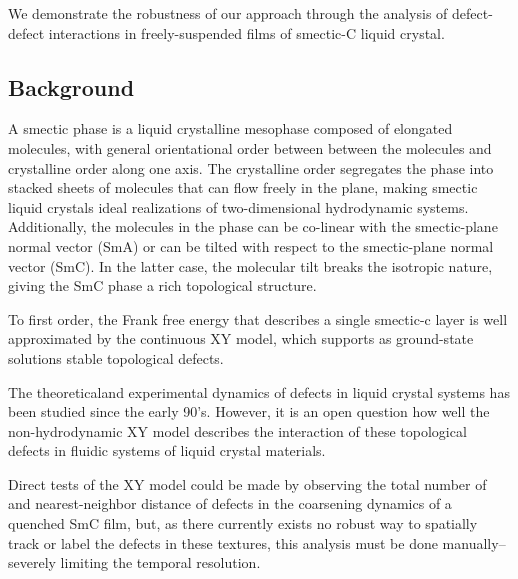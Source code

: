 \documentclass[prl,reprint,showpacs,floatfix,nofootinbib]{revtex4-1}
\begin{document}
We demonstrate the robustness of our approach through the analysis of defect-defect interactions in freely-suspended films of smectic-C liquid crystal.

\subsection{Background}
A smectic phase is a liquid crystalline mesophase composed of elongated molecules, with general orientational order between between the molecules and crystalline order along one axis.
The crystalline order segregates the phase into stacked sheets of molecules that can flow freely in the plane, making smectic liquid crystals ideal realizations of two-dimensional hydrodynamic systems. Additionally, the molecules in the phase can be co-linear with the smectic-plane normal vector (SmA) or can be tilted with respect to the smectic-plane normal vector (SmC). In the latter case, the molecular tilt breaks the isotropic nature, giving the SmC phase a rich topological structure. 

To first order, the Frank free energy that describes a single smectic-c layer is well approximated by the continuous XY model, which supports as ground-state solutions stable topological defects.


The theoretical\cite{yurke_coarsening_1993, svensek_hydrodynamics_2002, svensek_hydrodynamics_2003,radzihovsky_anomalous_2015, pleiner_dynamics_1988}and experimental\cite{pargellis_defect_1992, pargellis_planar_1994, oswald_nematic_2005,stannarius_defect_2016} dynamics of defects in liquid crystal systems has been studied since the early 90's. However, it is an open question how well the non-hydrodynamic XY model describes the interaction of these topological defects in fluidic systems of liquid crystal materials.

Direct tests of the XY model could be made by observing the total number of and nearest-neighbor distance of defects in the coarsening dynamics of a quenched SmC film, but, as there currently exists no robust way to spatially track or label the defects in these textures, this analysis must be done manually-- severely limiting the temporal resolution.
\end{document}
